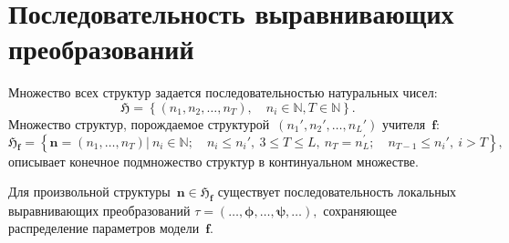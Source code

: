 \section{Последовательность выравнивающих преобразований}

Множество всех структур задается последовательностью натуральных чисел:
\[
\mathfrak{H} = \left\{(n_1, n_2, \ldots, n_{T}), \quad n_i \in \mathbb{N}, T \in \mathbb{N}\right\}.
\]
Множество структур, порождаемое структурой~$(n_{1}', n_{2}', \ldots, n_{L}')$ учителя~$\mathbf{f}$:
\[
\mathfrak{H}_{\mathbf{f}} = \left\{\mathbf{n} = \left(n_1, \ldots, n_{T}\right)|~ n_i \in \mathbb{N}; \quad n_i \leq n_{i}',~3\leq T\leq L,~n_{T}=n^{'}_{L}; \quad n_{T-1} \leq n_{i}',~i > T\right\},
\]
описывает конечное подмножество структур в континуальном множестве.


\begin{theorem}
\label{th-9:visual}
Для произвольной структуры~$\mathbf{n} \in \mathfrak{H}_{\mathbf{f}}$ существует последовательность локальных выравнивающих преобразований $\tau = (\ldots, \bm{\phi}, \ldots, \bm{\psi}, \ldots),$ сохраняющее распределение параметров модели~$\mathbf{f}$.
\end{theorem}
